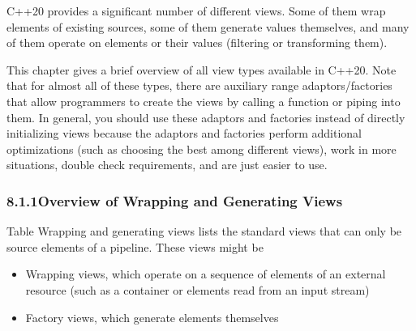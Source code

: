 
C++20 provides a significant number of different views. Some of them wrap elements of existing sources, some of them generate values themselves, and many of them operate on elements or their values (filtering or transforming them).

This chapter gives a brief overview of all view types available in C++20. Note that for almost all of these types, there are auxiliary range adaptors/factories that allow programmers to create the views by calling a function or piping into them. In general, you should use these adaptors and factories instead of directly initializing views because the adaptors and factories perform additional optimizations (such as choosing the best among different views), work in more situations, double check requirements, and are just easier to use.

\subsubsection*{ 8.1.1\hspace{0.2cm}Overview of Wrapping and Generating Views}

Table Wrapping and generating views lists the standard views that can only be source elements of a pipeline.
These views might be

\begin{itemize}
\item
Wrapping views, which operate on a sequence of elements of an external resource (such as a container or elements read from an input stream)

\item
Factory views, which generate elements themselves
\end{itemize}


